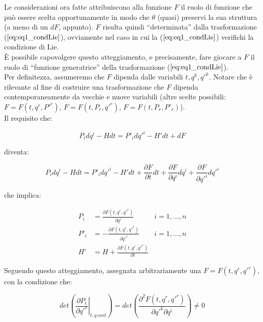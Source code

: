 
Le considerazioni ora fatte attribuiscono alla funzione $ F $ il ruolo di funzione che può essere scelta opportunamente in modo che $ \theta $ (quasi) preservi la sua struttura (a meno di un $ dF $, appunto). $ F $ risulta quindi ``determinata'' dalla trasformazione ($ \ref{eq:eq1_condLie} $), ovviamente nel caso in cui la ($ \ref{eq:eq1_condLie} $) verifichi la condizione di Lie. \\

È possibile capovolgere questo atteggiamento, e precisamente, fare giocare a $ F $ il ruolo di ``funzione generatrice'' della trasformazione ($ \ref{eq:eq1_condLie} $).\\
Per definitezza, assumeremo che $ F $ dipenda dalle variabili $ t, q^k, q'^k $. Notare che è rilevante al fine di costruire una trasformazione che $ F $ dipenda contemporaneamente da vecchie e nuove variabili (altre scelte possibili: $ F = F (t, q^r, P'^r) $, $ F = F (t, P_r, q'^r) $, $ F = F (t, P_r, P'_r) $). \\
Il requisito che:

\begin{equation*}
  P_i dq^i - H dt = P'_i dq'^i - H' dt + dF
\end{equation*}

diventa:

\begin{equation*}
  P_i dq^i - H dt = P'_i dq'^i - H' dt + \frac{\partial F}{\partial t} dt + \frac{\partial F}{\partial q^i} dq^i + \frac{\partial F}{\partial q'^i} dq'^i
\end{equation*}

che implica:

\begin{subequations} \label{eq:eq4_condlie}
  \begin{align}
    P_i &= \frac{\partial F(t,q^r, q'^r)}{\partial q^i} & i = 1, \dots , n \\
    P'_i &= - \frac{\partial F(t,q^r, q'^r)}{\partial q'^i} & i = 1, \dots , n \\
    H' &= H + \frac{\partial F(t,q^r, q'^r)}{\partial t}
  \end{align}
\end{subequations}

Seguendo questo atteggiamento, assegnata arbitrariamente una $ F = F (t, q^r, q'^r) $, con la condizione che:

\begin{equation}\label{eq:eq5_condlie}
  det \left( \left.\frac{\partial P_i}{\partial q'^r} \right|_{t,q~cost} \right) = det \left( \frac{\partial^2 F(t,q^r, q'^r)}{\partial q'^k \partial q^i} \right) \neq 0
\end{equation}

